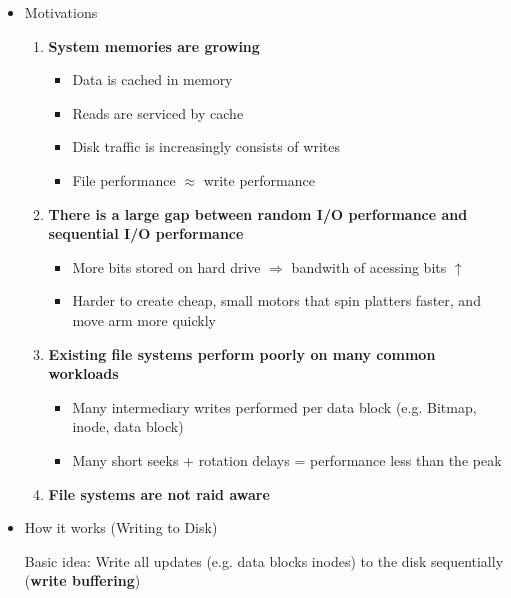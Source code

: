 \documentclass[12pt]{article}
\begin{document}
\begin{enumerate}[1.]
\begin{enumerate}[1)]
\begin{itemize}
\begin{itemize}
                \item Motivations
                \begin{enumerate}[1.]
                    \item \textbf{System memories are growing}
                    \begin{itemize}
                        \item Data is cached in memory
                        \item Reads are serviced by cache
                        \item Disk traffic is increasingly consists of writes
                        \item File performance $\approx$ write performance
                    \end{itemize}
                    \item \textbf{There is a large gap between random I/O performance and
                    sequential I/O performance}
                    \begin{itemize}
                        \item More bits stored on hard drive $\Rightarrow$ bandwith of acessing bits $\uparrow$
                        \item Harder to create cheap, small motors that spin platters faster, and move arm more quickly
                    \end{itemize}
                    \item \textbf{Existing file systems perform poorly on many common workloads}
                    \begin{itemize}
                        \item Many intermediary writes performed per data block (e.g. Bitmap, inode, data block)
                        \item Many short seeks + rotation delays = performance less than the peak
                    \end{itemize}
                    \item \textbf{File systems are not raid aware}
                \end{enumerate}

                \item How it works (Writing to Disk)

                \bigskip

                Basic idea: Write all updates (e.g. data blocks inodes) to the
                disk sequentially (\textbf{write buffering})


\end{itemize}
\end{itemize}
\end{enumerate}
\end{enumerate}
\end{document}

